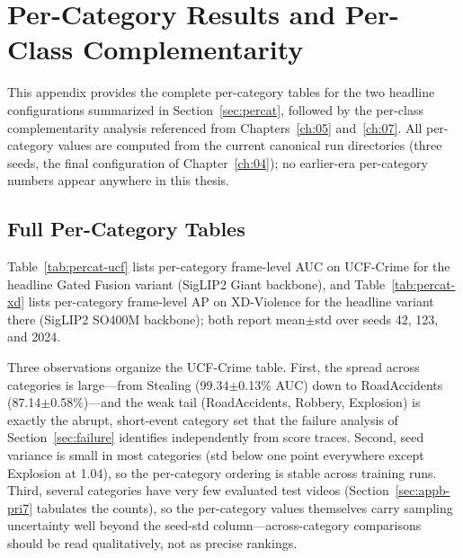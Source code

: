 \chapter{Per-Category Results and Per-Class Complementarity}
\label{app:b}

This appendix provides the complete per-category tables for the two headline
configurations summarized in Section~\ref{sec:percat}, followed by the
per-class complementarity analysis referenced from
Chapters~\ref{ch:05} and~\ref{ch:07}. All per-category values are computed
from the current canonical run directories (three seeds, the final
configuration of Chapter~\ref{ch:04}); no earlier-era per-category numbers
appear anywhere in this thesis.

\section{Full Per-Category Tables}
\label{sec:appb-tables}




Table~\ref{tab:percat-ucf} lists per-category frame-level AUC on UCF-Crime
for the headline Gated Fusion variant (SigLIP2 Giant backbone), and
Table~\ref{tab:percat-xd} lists per-category frame-level AP on XD-Violence
for the headline variant there (SigLIP2 SO400M backbone); both report
mean$\pm$std over seeds 42, 123, and 2024.

Three observations organize the UCF-Crime table. First, the spread across
categories is large---from Stealing (99.34$\pm$0.13\% AUC) down to
RoadAccidents (87.14$\pm$0.58\%)---and the weak tail (RoadAccidents,
Robbery, Explosion) is exactly the abrupt, short-event category set that the
failure analysis of Section~\ref{sec:failure} identifies independently from
score traces. Second, seed variance is small in most categories (std below
one point everywhere except Explosion at 1.04), so the per-category ordering
is stable across training runs. Third, several categories have very few
evaluated test videos (Section~\ref{sec:appb-pri7} tabulates the counts), so
the per-category values themselves carry sampling uncertainty well beyond
the seed-std column---across-category comparisons should be read
qualitatively, not as precise rankings.

